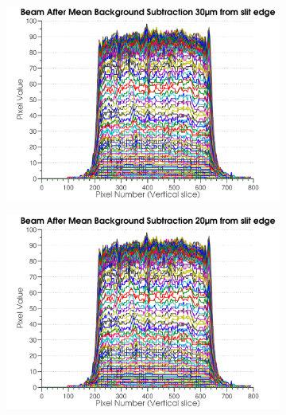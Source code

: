 \begin{figure}
\begin{subfigure}[b]{0.45\textwidth}
                \includegraphics[width=\textwidth]{figures/beam/fig_beam_blind_thres170_mean.pdf}
                \caption{}
                \label{figallbeams5}
        \end{subfigure}
				\qquad
        \begin{subfigure}[b]{0.45\textwidth}
                \centering
                \includegraphics[width=\textwidth]{figures/beam/fig_beam_blind_thres160_mean.pdf}
                \caption{}
                \label{figallbeams6}
        \end{subfigure}
				\\
				\begin{subfigure}[b]{0.45\textwidth}
                \centering

\end{subfigure}
\end{figure}
